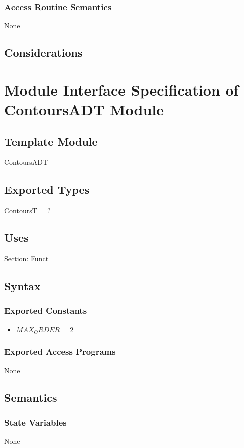 \documentclass[12pt]{article}
\begin{document}
\subsubsection{Access Routine Semantics}
\label{Sec:AccRoutSemantics}
None
\subsection{Considerations}
\label{Sec:Considerations}
\section{Module Interface Specification of ContoursADT Module}
\label{Sec:ContoursADT}
\subsection{Template Module}
\label{Sec:TemplateModule}
ContoursADT
\subsection{Exported Types}
\label{Sec:ExpTypes}
ContoursT = ?
\subsection{Uses}
\label{Sec:Uses}
\hyperref[Sec:FunctADT]{Section: Funct}
\subsection{Syntax}
\label{Sec:Syntax}
\subsubsection{Exported Constants}
\label{Sec:ExpConstants}
\begin{itemize}
\item{$MAX_ORDER$ = $2$}
\end{itemize}
\subsubsection{Exported Access Programs}
\label{Sec:ExpAccPrograms}
None
\subsection{Semantics}
\label{Sec:Semantics}
\subsubsection{State Variables}
\label{Sec:StateVars}
None
\end{document}
